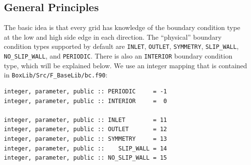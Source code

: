 \subsection{General Principles}
The basic idea is that every grid has knowledge of the
boundary condition type at the low and high side edge in each direction.
The ``physical'' boundary condition types supported by default are {\tt INLET}, {\tt OUTLET},
{\tt SYMMETRY}, {\tt SLIP\_WALL}, {\tt NO\_SLIP\_WALL}, and {\tt PERIODIC}.
There is also an {\tt INTERIOR} boundary condition type, which 
will be explained below.  We use an integer mapping that is 
contained in {\tt BoxLib/Src/F\_BaseLib/bc.f90}:
\begin{lstlisting}[backgroundcolor=\color{light-green}]
integer, parameter, public :: PERIODIC     = -1
integer, parameter, public :: INTERIOR     =  0

integer, parameter, public :: INLET        = 11
integer, parameter, public :: OUTLET       = 12
integer, parameter, public :: SYMMETRY     = 13
integer, parameter, public ::    SLIP_WALL = 14
integer, parameter, public :: NO_SLIP_WALL = 15
\end{lstlisting}

